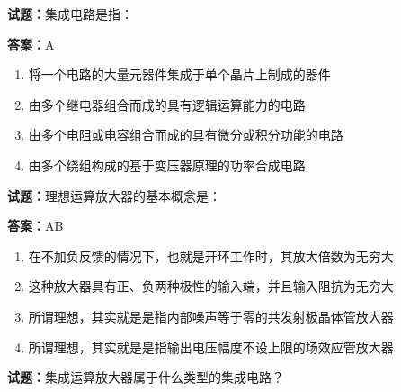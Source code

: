 \documentclass{ctexbook}
\begin{document}




\vspace{1em}

\textbf{试题：}集成电路是指： 

\textbf{答案：}A 

\begin{enumerate}[leftmargin=3em]
  \item 将一个电路的大量元器件集成于单个晶片上制成的器件 

  \item 由多个继电器组合而成的具有逻辑运算能力的电路 

  \item 由多个电阻或电容组合而成的具有微分或积分功能的电路 

  \item 由多个绕组构成的基于变压器原理的功率合成电路 

\end{enumerate}





\vspace{1em}

\textbf{试题：}理想运算放大器的基本概念是： 

\textbf{答案：}AB 

\begin{enumerate}[leftmargin=3em]
  \item 在不加负反馈的情况下，也就是开环工作时，其放大倍数为无穷大 

  \item 这种放大器具有正、负两种极性的输入端，并且输入阻抗为无穷大 


  \item 所谓理想，其实就是是指内部噪声等于零的共发射极晶体管放大器 

  \item 所谓理想，其实就是是指输出电压幅度不设上限的场效应管放大器 

\end{enumerate}





\vspace{1em}

\textbf{试题：}集成运算放大器属于什么类型的集成电路？ 
\end{document}
